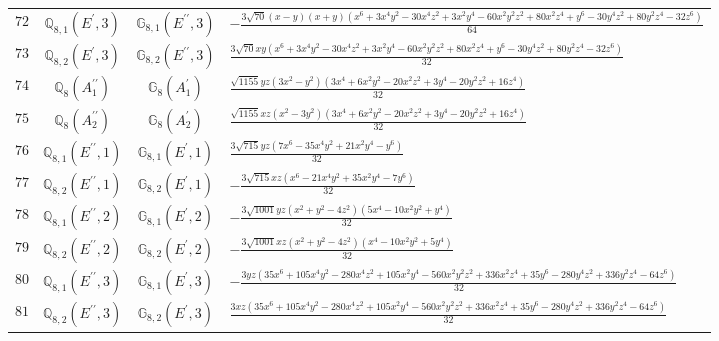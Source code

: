\documentclass[fleqn,8pt,landscape]{jsarticle}
\begin{document}
\begin{table}[ht!]
\begin{center}
\begin{tabular}{cccl}
$ 72 $ & $ \mathbb{Q}_{8,1}(E^{\prime},3) $ & $ \mathbb{G}_{8,1}(E^{\prime\prime},3) $ & $ - \frac{3 \sqrt{70} \left(x - y\right) \left(x + y\right) \left(x^{6} + 3 x^{4} y^{2} - 30 x^{4} z^{2} + 3 x^{2} y^{4} - 60 x^{2} y^{2} z^{2} + 80 x^{2} z^{4} + y^{6} - 30 y^{4} z^{2} + 80 y^{2} z^{4} - 32 z^{6}\right)}{64} $ \\
$ 73 $ & $ \mathbb{Q}_{8,2}(E^{\prime},3) $ & $ \mathbb{G}_{8,2}(E^{\prime\prime},3) $ & $ \frac{3 \sqrt{70} x y \left(x^{6} + 3 x^{4} y^{2} - 30 x^{4} z^{2} + 3 x^{2} y^{4} - 60 x^{2} y^{2} z^{2} + 80 x^{2} z^{4} + y^{6} - 30 y^{4} z^{2} + 80 y^{2} z^{4} - 32 z^{6}\right)}{32} $ \\
$ 74 $ & $ \mathbb{Q}_{8}(A_{1}^{\prime\prime}) $ & $ \mathbb{G}_{8}(A_{1}^{\prime}) $ & $ \frac{\sqrt{1155} y z \left(3 x^{2} - y^{2}\right) \left(3 x^{4} + 6 x^{2} y^{2} - 20 x^{2} z^{2} + 3 y^{4} - 20 y^{2} z^{2} + 16 z^{4}\right)}{32} $ \\
$ 75 $ & $ \mathbb{Q}_{8}(A_{2}^{\prime\prime}) $ & $ \mathbb{G}_{8}(A_{2}^{\prime}) $ & $ \frac{\sqrt{1155} x z \left(x^{2} - 3 y^{2}\right) \left(3 x^{4} + 6 x^{2} y^{2} - 20 x^{2} z^{2} + 3 y^{4} - 20 y^{2} z^{2} + 16 z^{4}\right)}{32} $ \\
$ 76 $ & $ \mathbb{Q}_{8,1}(E^{\prime\prime},1) $ & $ \mathbb{G}_{8,1}(E^{\prime},1) $ & $ \frac{3 \sqrt{715} y z \left(7 x^{6} - 35 x^{4} y^{2} + 21 x^{2} y^{4} - y^{6}\right)}{32} $ \\
$ 77 $ & $ \mathbb{Q}_{8,2}(E^{\prime\prime},1) $ & $ \mathbb{G}_{8,2}(E^{\prime},1) $ & $ - \frac{3 \sqrt{715} x z \left(x^{6} - 21 x^{4} y^{2} + 35 x^{2} y^{4} - 7 y^{6}\right)}{32} $ \\
$ 78 $ & $ \mathbb{Q}_{8,1}(E^{\prime\prime},2) $ & $ \mathbb{G}_{8,1}(E^{\prime},2) $ & $ - \frac{3 \sqrt{1001} y z \left(x^{2} + y^{2} - 4 z^{2}\right) \left(5 x^{4} - 10 x^{2} y^{2} + y^{4}\right)}{32} $ \\
$ 79 $ & $ \mathbb{Q}_{8,2}(E^{\prime\prime},2) $ & $ \mathbb{G}_{8,2}(E^{\prime},2) $ & $ - \frac{3 \sqrt{1001} x z \left(x^{2} + y^{2} - 4 z^{2}\right) \left(x^{4} - 10 x^{2} y^{2} + 5 y^{4}\right)}{32} $ \\
$ 80 $ & $ \mathbb{Q}_{8,1}(E^{\prime\prime},3) $ & $ \mathbb{G}_{8,1}(E^{\prime},3) $ & $ - \frac{3 y z \left(35 x^{6} + 105 x^{4} y^{2} - 280 x^{4} z^{2} + 105 x^{2} y^{4} - 560 x^{2} y^{2} z^{2} + 336 x^{2} z^{4} + 35 y^{6} - 280 y^{4} z^{2} + 336 y^{2} z^{4} - 64 z^{6}\right)}{32} $ \\
$ 81 $ & $ \mathbb{Q}_{8,2}(E^{\prime\prime},3) $ & $ \mathbb{G}_{8,2}(E^{\prime},3) $ & $ \frac{3 x z \left(35 x^{6} + 105 x^{4} y^{2} - 280 x^{4} z^{2} + 105 x^{2} y^{4} - 560 x^{2} y^{2} z^{2} + 336 x^{2} z^{4} + 35 y^{6} - 280 y^{4} z^{2} + 336 y^{2} z^{4} - 64 z^{6}\right)}{32} $ \\
 \hline \hline
\end{tabular}
\end{center}
\end{table}
\end{document}
